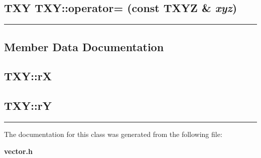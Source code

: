 \subsection{\setlength{\rightskip}{0pt plus 5cm}TXY TXY::operator= (const {\bf TXYZ} \& {\em xyz})\hspace{0.3cm}{\tt  [inline]}}

\vspace{0.4cm}\hrule\vspace{0.2cm}
\subsection*{Member Data Documentation}
\label{TXY_a3}
\subsection{ TXY::r\-X}

\label{TXY_a4}
\subsection{ TXY::r\-Y}

\vspace{0.4cm}\hrule\vspace{0.2cm}
The documentation for this class was generated from the following file:\begin{CompactItemize}
\item 
{\bf vector.h}\end{CompactItemize}
